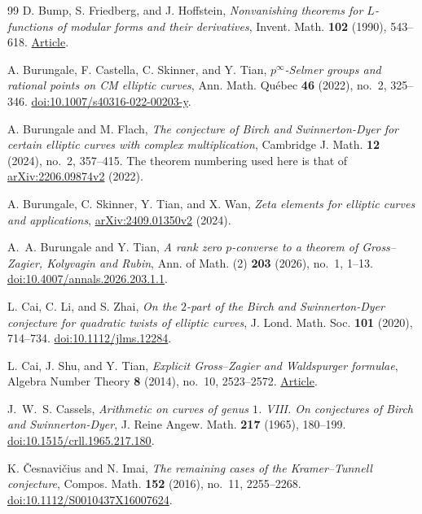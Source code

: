 \begin{thebibliography}{99}
D. Bump, S. Friedberg, and J. Hoffstein,
\emph{Nonvanishing theorems for $L$-functions of modular forms and their derivatives},
Invent. Math. \textbf{102} (1990), 543--618.
\href{https://wstein.org/papers/bib/bump-friedberg-hoffstein-nonvanishing.pdf}{Article}.

A. Burungale, F. Castella, C. Skinner, and Y. Tian,
\emph{$p^\infty$-Selmer groups and rational points on CM elliptic curves},
Ann. Math. Qu\'ebec \textbf{46} (2022), no.~2, 325--346.
\href{https://doi.org/10.1007/s40316-022-00203-y}{doi:10.1007/s40316-022-00203-y}.

A. Burungale and M. Flach,
\emph{The conjecture of Birch and Swinnerton-Dyer for certain elliptic curves with complex multiplication},
Cambridge J. Math. \textbf{12} (2024), no.~2, 357--415.
The theorem numbering used here is that of
\href{https://arxiv.org/abs/2206.09874v2}{arXiv:2206.09874v2} (2022).

A. Burungale, C. Skinner, Y. Tian, and X. Wan,
\emph{Zeta elements for elliptic curves and applications},
\href{https://arxiv.org/abs/2409.01350v2}{arXiv:2409.01350v2} (2024).

A.~A. Burungale and Y. Tian,
\emph{A rank zero $p$-converse to a theorem of Gross--Zagier, Kolyvagin and Rubin},
Ann. of Math. (2) \textbf{203} (2026), no.~1, 1--13.
\href{https://doi.org/10.4007/annals.2026.203.1.1}{doi:10.4007/annals.2026.203.1.1}.

L. Cai, C. Li, and S. Zhai,
\emph{On the $2$-part of the Birch and Swinnerton-Dyer conjecture for quadratic twists of elliptic curves},
J. Lond. Math. Soc. \textbf{101} (2020), 714--734.
\href{https://doi.org/10.1112/jlms.12284}{doi:10.1112/jlms.12284}.

L. Cai, J. Shu, and Y. Tian,
\emph{Explicit Gross--Zagier and Waldspurger formulae},
Algebra Number Theory \textbf{8} (2014), no.~10, 2523--2572.
\href{https://msp.org/ant/2014/8-10/ant-v8-n10-p05-s.pdf}{Article}.

J.~W.~S. Cassels,
\emph{Arithmetic on curves of genus $1$. VIII. On conjectures of Birch and Swinnerton-Dyer},
J. Reine Angew. Math. \textbf{217} (1965), 180--199.
\href{https://doi.org/10.1515/crll.1965.217.180}{doi:10.1515/crll.1965.217.180}.

K. \v{C}esnavi\v{c}ius and N. Imai,
\emph{The remaining cases of the Kramer--Tunnell conjecture},
Compos. Math. \textbf{152} (2016), no.~11, 2255--2268.
\href{https://doi.org/10.1112/S0010437X16007624}{doi:10.1112/S0010437X16007624}.


\end{thebibliography}
